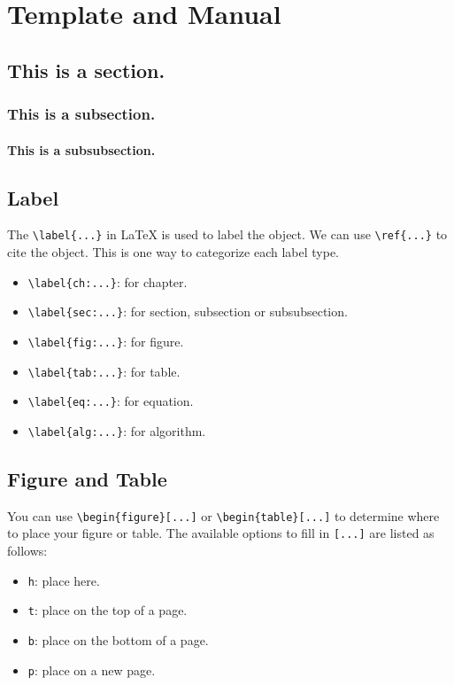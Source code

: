 \chapter{Template and Manual}

\section{This is a section.}

\subsection{This is a subsection.}

\subsubsection{This is a subsubsection.}

\section{Label}
The \verb|\label{...}| in LaTeX is used to label the object. We can use \verb|\ref{...}| to cite the object. This is one way to categorize each label type.
\begin{itemize}
    \item \verb|\label{ch:...}|: for chapter.
    \item \verb|\label{sec:...}|: for section, subsection or subsubsection.
    \item \verb|\label{fig:...}|: for figure.
    \item \verb|\label{tab:...}|: for table.
    \item \verb|\label{eq:...}|: for equation.
    \item \verb|\label{alg:...}|: for algorithm.
\end{itemize}

\section{Figure and Table}
You can use \verb|\begin{figure}[...]| or \verb|\begin{table}[...]| to determine where to place your figure or table. The available options to fill in \verb|[...]| are listed as follows:
\begin{itemize}
    \item \texttt{h}: place here.
    \item \texttt{t}: place on the top of a page.
    \item \texttt{b}: place on the bottom of a page.
    \item \texttt{p}: place on a new page.
\end{itemize}

